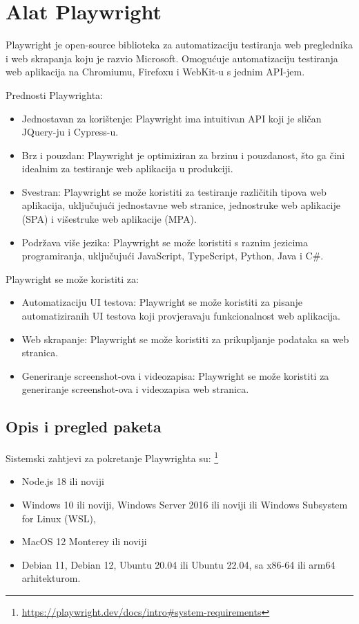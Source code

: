 \chapter{Alat Playwright}\label{ch_playwright}
Playwright je open-source biblioteka za automatizaciju testiranja web preglednika i web skrapanja koju je razvio Microsoft. Omogućuje automatizaciju testiranja web aplikacija na Chromiumu, Firefoxu i WebKit-u s jednim API-jem.

Prednosti Playwrighta:

\begin{itemize}

\item Jednostavan za korištenje: Playwright ima intuitivan API koji je sličan JQuery-ju i Cypress-u.
\item Brz i pouzdan: Playwright je optimiziran za brzinu i pouzdanost, što ga čini idealnim za testiranje web aplikacija u produkciji.
\item Svestran: Playwright se može koristiti za testiranje različitih tipova web aplikacija, uključujući jednostavne web stranice, jednostruke web aplikacije (SPA) i višestruke web aplikacije (MPA).
\item Podržava više jezika: Playwright se može koristiti s raznim jezicima programiranja, uključujući JavaScript, TypeScript, Python, Java i C\#.
\end{itemize}

Playwright se može koristiti za:
\begin{itemize}
\item Automatizaciju UI testova: Playwright se može koristiti za pisanje automatiziranih UI testova koji provjeravaju funkcionalnost web aplikacija.
\item Web skrapanje: Playwright se može koristiti za prikupljanje podataka sa web stranica.
\item Generiranje screenshot-ova i videozapisa: Playwright se može koristiti za generiranje screenshot-ova i videozapisa web stranica.
\end{itemize}
    
\section{Opis i pregled paketa}
Sistemski zahtjevi za pokretanje Playwrighta su: \footnote{\url{https://playwright.dev/docs/intro\#system-requirements}}
\begin{itemize}
    \item Node.js 18 ili noviji
    \item Windows 10 ili noviji, Windows Server 2016 ili noviji ili Windows Subsystem for Linux (WSL),
    \item MacOS 12 Monterey ili noviji
    \item Debian 11, Debian 12, Ubuntu 20.04 ili Ubuntu 22.04, sa x86-64 ili arm64 arhitekturom.
\end{itemize}


